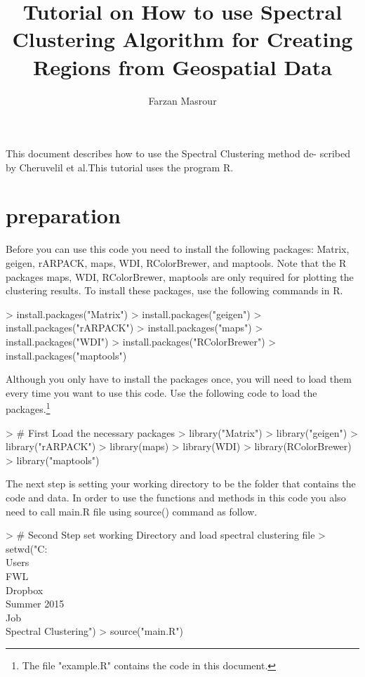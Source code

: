 \documentclass{article}
\author{Farzan Masrour}
\title{Tutorial on How to use Spectral Clustering Algorithm for Creating Regions from Geospatial Data}
\begin{document}

\newcommand{\todo}[1] {{\textcolor{red}{\noindent ToDo: #1}\newline}}
\maketitle
This document describes how to use the Spectral Clustering method de- scribed by Cheruvelil et al.This tutorial uses the program {\color{blue}R}.

\section {preparation}
Before you can use this code you need to install the following packages: Matrix, geigen, rARPACK, maps, WDI, RColorBrewer, and maptools. Note that the R packages maps, WDI, RColorBrewer, maptools are only required for plotting the clustering results. To install these packages, use the following commands in R.
\begin{Schunk}
\begin{Sinput}
> install.packages("Matrix")
> install.packages("geigen")
> install.packages("rARPACK")
> install.packages("maps")
> install.packages("WDI")
> install.packages("RColorBrewer")
> install.packages("maptools")
\end{Sinput}
\end{Schunk}
Although you only have to install the packages once, you will need to load them every time you want to use this code. Use the following code to load the packages.\footnote{The file "example.R" contains the code in this document.}
\begin{Schunk}
\begin{Sinput}
> # First Load the necessary packages 
> library("Matrix")
> library("geigen")
> library("rARPACK")
> library(maps)
> library(WDI)
> library(RColorBrewer)
> library("maptools")
\end{Sinput}
\end{Schunk}
The next step is setting your working directory to be the folder that contains the code and data. In order to use the functions and methods in this code you also need to call main.R file using source() command as follow.

\begin{Schunk}
\begin{Sinput}
> # Second Step set working Directory and load spectral clustering file
> setwd("C:\\Users\\FWL\\Dropbox\\Summer 2015\\Job\\Spectral Clustering")
> source("main.R")
\end{Sinput}
\end{Schunk}
\end{document}

